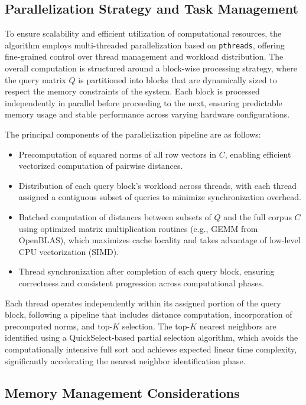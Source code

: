 \documentclass[conference]{IEEEtran}
\begin{document}
\subsection{Parallelization Strategy and Task Management}

To ensure scalability and efficient utilization of computational resources, the algorithm employs multi-threaded 
parallelization based on \texttt{pthreads}, offering fine-grained control over thread management and workload 
distribution. The overall computation is structured around a block-wise processing strategy, where the query 
matrix $Q$ is partitioned into blocks that are dynamically sized to respect the memory constraints of the system. 
Each block is processed independently in parallel before proceeding to the next, ensuring predictable memory usage 
and stable performance across varying hardware configurations.

The principal components of the parallelization pipeline are as follows:

\begin{itemize}
    \item Precomputation of squared norms of all row vectors in $C$, enabling efficient vectorized computation 
    of pairwise distances.
    \item Distribution of each query block's workload across threads, with each thread assigned a contiguous 
    subset of queries to minimize synchronization overhead.
    \item Batched computation of distances between subsets of $Q$ and the full corpus $C$ using optimized matrix 
    multiplication routines (e.g., GEMM from OpenBLAS), which maximizes cache locality and takes advantage of 
    low-level CPU vectorization (SIMD).
    \item Thread synchronization after completion of each query block, ensuring correctness and consistent 
    progression across computational phases.
\end{itemize}

Each thread operates independently within its assigned portion of the query block, following a pipeline 
that includes distance computation, incorporation of precomputed norms, and top-$K$ selection. 
The top-$K$ nearest neighbors are identified using a QuickSelect-based partial selection algorithm, 
which avoids the computationally intensive full sort and achieves expected linear time complexity, 
significantly accelerating the nearest neighbor identification phase.

\subsection{Memory Management Considerations}
\end{document}
